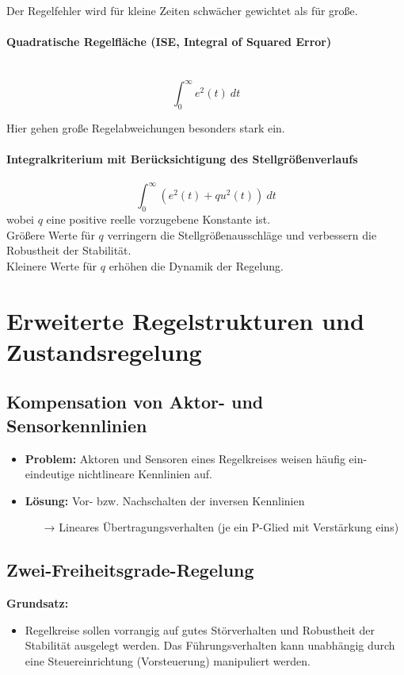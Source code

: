 \documentclass[10pt,a4paper]{article}
\begin{document}
Der Regelfehler wird für kleine Zeiten schwächer gewichtet als für große.

\paragraph{Quadratische Regelfläche (ISE, Integral of Squared Error)} ~\\
$$
	\int_0^∞ e^2(t) ~dt
$$

Hier gehen große Regelabweichungen besonders stark ein.

\paragraph{Integralkriterium mit Berücksichtigung des Stellgrößenverlaufs}
$$
	\int_0^∞ (e^2(t) + qu^2(t)) ~dt
$$
wobei $q$ eine positive reelle vorzugebene Konstante ist. \\
Größere Werte für $q$ verringern die Stellgrößenausschläge und verbessern die Robustheit der Stabilität. \\
Kleinere Werte für $q$ erhöhen die Dynamik der Regelung.

\section{Erweiterte Regelstrukturen und Zustandsregelung}
\subsection{Kompensation von Aktor- und Sensorkennlinien}
\begin{itemize}
	\item \textbf{Problem:} Aktoren und Sensoren eines Regelkreises weisen häufig ein-eindeutige nichtlineare Kennlinien auf.
	\item \textbf{Lösung:} Vor- bzw. Nachschalten der inversen Kennlinien
	\begin{itemize}
		\item[→] Lineares Übertragungsverhalten (je ein P-Glied mit Verstärkung eins)
	\end{itemize}
\end{itemize}

\subsection{Zwei-Freiheitsgrade-Regelung}
\textbf{Grundsatz:}
\begin{itemize}
	\item Regelkreise sollen vorrangig auf gutes Störverhalten und Robustheit der Stabilität ausgelegt werden. Das Führungsverhalten kann unabhängig durch eine Steuereinrichtung (Vorsteuerung) manipuliert werden.
\end{itemize}
\end{document}
